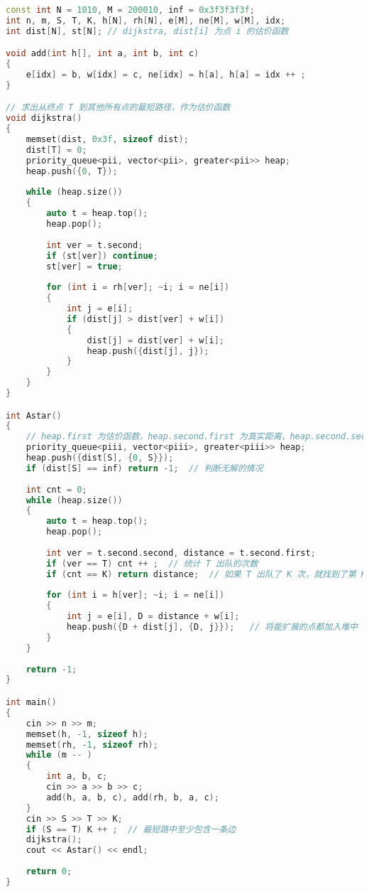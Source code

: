 \begin{lstlisting}[language=cpp]
const int N = 1010, M = 200010, inf = 0x3f3f3f3f;
int n, m, S, T, K, h[N], rh[N], e[M], ne[M], w[M], idx;
int dist[N], st[N]; // dijkstra, dist[i] 为点 i 的估价函数

void add(int h[], int a, int b, int c)
{
    e[idx] = b, w[idx] = c, ne[idx] = h[a], h[a] = idx ++ ;
}

// 求出从终点 T 到其他所有点的最短路径，作为估价函数
void dijkstra()
{
    memset(dist, 0x3f, sizeof dist);
    dist[T] = 0;
    priority_queue<pii, vector<pii>, greater<pii>> heap;
    heap.push({0, T});
    
    while (heap.size())
    {
        auto t = heap.top();
        heap.pop();
        
        int ver = t.second;
        if (st[ver]) continue;
        st[ver] = true;
        
        for (int i = rh[ver]; ~i; i = ne[i])
        {
            int j = e[i];
            if (dist[j] > dist[ver] + w[i])
            {
                dist[j] = dist[ver] + w[i];
                heap.push({dist[j], j});
            }
        }
    }
}

int Astar()
{
    // heap.first 为估价函数，heap.second.first 为真实距离，heap.second.second 为当前点的编号
    priority_queue<piii, vector<piii>, greater<piii>> heap;
    heap.push({dist[S], {0, S}});
    if (dist[S] == inf) return -1;  // 判断无解的情况
    
    int cnt = 0;
    while (heap.size())
    {
        auto t = heap.top();
        heap.pop();
        
        int ver = t.second.second, distance = t.second.first;
        if (ver == T) cnt ++ ;  // 统计 T 出队的次数
        if (cnt == K) return distance;  // 如果 T 出队了 K 次，就找到了第 K 短路
        
        for (int i = h[ver]; ~i; i = ne[i])
        {
            int j = e[i], D = distance + w[i];
            heap.push({D + dist[j], {D, j}});   // 将能扩展的点都加入堆中
        }
    }
    
    return -1;
}

int main()
{
    cin >> n >> m;
    memset(h, -1, sizeof h);
    memset(rh, -1, sizeof rh);
    while (m -- )
    {
        int a, b, c;
        cin >> a >> b >> c;
        add(h, a, b, c), add(rh, b, a, c);
    }
    cin >> S >> T >> K;
    if (S == T) K ++ ;  // 最短路中至少包含一条边
    dijkstra();
    cout << Astar() << endl;
    
    return 0;
}
\end{lstlisting}
